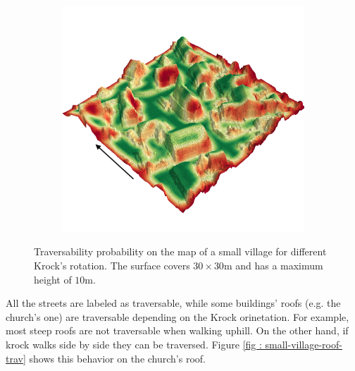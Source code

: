\documentclass[../document.tex]{subfiles}
\begin{document}
\begin{figure} [htbp]
\begin{subfigure}[b]{0.45\textwidth}
  \end{subfigure}
  \begin{subfigure}[b]{0.45\textwidth}
      \includegraphics[width=\linewidth]{../img/4/traversability/sullens/-180.png}  
  \end{subfigure}
  \caption{Traversability probability on the map of a small village for different Krock's rotation. The surface covers $30\times 30$m and has a maximum height of $10$m.}
  \label{fig : small-village-trav}
  \end{figure}
  All the streets are labeled as traversable, while some buildings' roofs (e.g. the church's one) are traversable depending on the Krock orinetation. For example, most steep roofs are not traversable when walking uphill. On the other hand, if krock walks side by side they can be traversed. Figure \ref{fig : small-village-roof-trav} shows this behavior on the church's roof.
\end{document}

